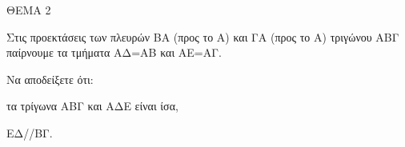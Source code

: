 
ΘΕΜΑ 2

Στις προεκτάσεις των πλευρών ΒΑ (προς το Α) και ΓΑ (προς το Α) τριγώνου ΑΒΓ παίρνουμε τα τμήματα ΑΔ=ΑΒ και ΑΕ=ΑΓ.

Να αποδείξετε ότι:

\begin{alist}
\item τα τρίγωνα ΑΒΓ και ΑΔΕ είναι ίσα, 

\item ΕΔ//ΒΓ. 
\end{alist}
